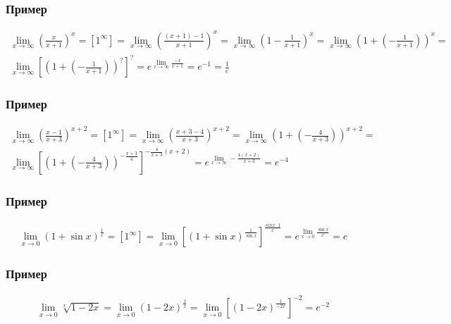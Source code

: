 \documentclass{article}
\begin{document}
\subsubsection{Пример}
\begin{gather*}
    \lim_{x \to \infty} \left( \frac{x}{x + 1} \right)^x = 
    \left[ 1^{\infty} \right] = 
    \lim_{x \to \infty} \left( \frac{(x + 1) - 1}{x + 1} \right)^x =
    \lim_{x \to \infty} \left( 1 - \frac{1}{x + 1} \right)^x = 
    \lim_{x \to \infty} \left( 1 + \left( -\frac{1}{x + 1} \right) \right)^x = \\
    \lim_{x \to \infty} \left[ \left( 1 + \left(-\frac{1}{x + 1} \right) \right)^{?} \right]^{?} =
    e^{\lim_{x \to \infty} \frac{-x}{x + 1}} = e^{-1} = \frac{1}{e}
\end{gather*}

\subsubsection{Пример}
\begin{gather*}
    \lim_{x \to \infty} \left(\frac{x - 1}{x + 3}\right)^{x + 2} = \left[1^\infty\right] = 
    \lim_{x \to \infty} \left(\frac{x + 3 - 4}{x + 3}\right)^{x + 2} =
    \lim_{x \to \infty} \left(1 + \left(-\frac{4}{x + 3}\right) \right)^{x + 2} = \\
    \lim_{x \to \infty} \left[ \left(1 + \left(-\frac{4}{x + 3}\right) \right)^{-\frac{x + 3}{4}} \right]^{-\frac{4}{x + 3} (x + 2)} =
    e^{\lim_{x \to \infty} -\frac{4(x + 2)}{x + 3}} = e^{-4}
\end{gather*}

\subsubsection{Пример}
\begin{gather*}
    \lim_{x \to 0} \left( 1 + \sin x \right)^{\frac{1}{x}} = 
    \left[ 1^{\infty} \right] =
    \lim_{x \to 0} \left[ \left( 1 + \sin x \right)^{\frac{1}{\sin x}} \right]^{\frac{sin x \cdot 1}{x}} =
    e^{\lim_{x \to 0} \frac{\sin x}{x}} = e 
\end{gather*}

\subsubsection{Пример}
\begin{gather*}
    \lim_{x \to 0} \sqrt[x]{1 - 2x} =
    \lim_{x \to 0} (1 - 2x)^{\frac{1}{x}} =
    \lim_{x \to 0} \left[(1 - 2x)^{\frac{1}{-2x}}\right]^{-2} =
    e^{-2}
\end{gather*}
\end{document}
